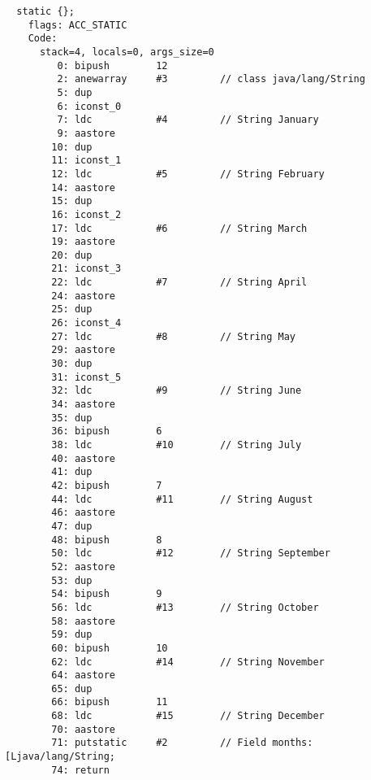 \begin{lstlisting}
  static {};
    flags: ACC_STATIC
    Code:
      stack=4, locals=0, args_size=0
         0: bipush        12
         2: anewarray     #3         // class java/lang/String
         5: dup           
         6: iconst_0      
         7: ldc           #4         // String January
         9: aastore       
        10: dup           
        11: iconst_1      
        12: ldc           #5         // String February
        14: aastore       
        15: dup           
        16: iconst_2      
        17: ldc           #6         // String March
        19: aastore       
        20: dup           
        21: iconst_3      
        22: ldc           #7         // String April
        24: aastore       
        25: dup           
        26: iconst_4      
        27: ldc           #8         // String May
        29: aastore       
        30: dup           
        31: iconst_5      
        32: ldc           #9         // String June
        34: aastore       
        35: dup           
        36: bipush        6
        38: ldc           #10        // String July
        40: aastore       
        41: dup           
        42: bipush        7
        44: ldc           #11        // String August
        46: aastore       
        47: dup           
        48: bipush        8
        50: ldc           #12        // String September
        52: aastore       
        53: dup           
        54: bipush        9
        56: ldc           #13        // String October
        58: aastore       
        59: dup           
        60: bipush        10
        62: ldc           #14        // String November
        64: aastore       
        65: dup           
        66: bipush        11
        68: ldc           #15        // String December
        70: aastore       
        71: putstatic     #2         // Field months:[Ljava/lang/String;
        74: return        
\end{lstlisting}



